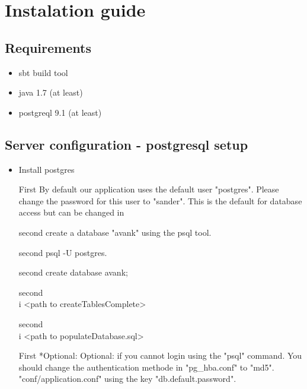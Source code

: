
\section{Instalation guide}
\subsection{Requirements}
\begin{itemize}
\item sbt build tool
\item java 1.7 (at least)
\item postgreql 9.1 (at least)
\end{itemize}

\subsection{Server configuration - postgresql setup}
\begin{itemize}
\item Install postgres
\item[First] By default our application uses the default user "postgres". Please change the password for this user to "sander". This is the default for database access but can be changed in
\item[second] create a database "avank" using the psql tool.
\item[second] psql -U postgres.
\item[second] create database avank;
\item[second] \\i <path to createTablesComplete>
\item[second] \\i <path to populateDatabase.sql>
\item[First] *Optional: Optional: if you cannot login using the "psql" command. You should change the authentication methode in "pg_hba.conf" to "md5". 
"conf/application.conf" using the key "db.default.password".
\end{itemize}
